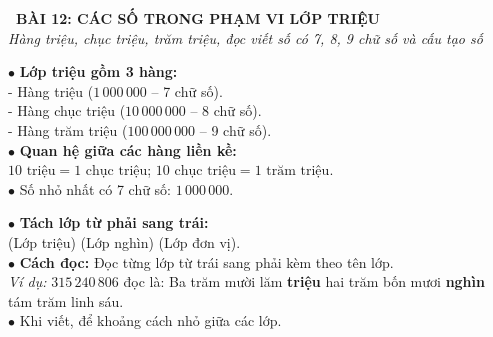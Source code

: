 \documentclass[14pt,a4paper,oneside]{extbook}
\begin{document}
\noindent
\begin{tcolorbox}[
  enhanced,
  colback=teal!8!white,
  colframe=teal!80!black,
  arc=3mm, boxrule=1pt,
  left=3mm, right=3mm, top=2mm, bottom=2mm,
  halign=center
]
  {\Large\bfseries\color{teal!90!black}\faBookmark\ BÀI 12: CÁC SỐ TRONG PHẠM VI LỚP TRIỆU}\\[1.5pt]
  {\footnotesize\itshape\color{black!75} Hàng triệu, chục triệu, trăm triệu, đọc viết số có 7, 8, 9 chữ số và cấu tạo số}
\end{tcolorbox}

\vspace{2.5mm}

\noindent
\begin{minipage}[t]{0.49\textwidth}
  \begin{tcolorbox}[
    enhanced,
    title={\footnotesize\bfseries\color{white}\faGlobe\ 1. Lớp triệu \& Các hàng},
    colback=blue!2!white,
    colframe=blue!75!black,
    arc=2.5mm, boxrule=0.8pt, top=1.8mm, bottom=1.8mm, left=2mm, right=2mm
  ]
    \footnotesize
    $\bullet$ \textbf{Lớp triệu gồm 3 hàng:}\\
    - Hàng triệu ($1\,000\,000$ -- 7 chữ số).\\
    - Hàng chục triệu ($10\,000\,000$ -- 8 chữ số).\\
    - Hàng trăm triệu ($100\,000\,000$ -- 9 chữ số).\\
    $\bullet$ \textbf{Quan hệ giữa các hàng liền kề:}\\
    $10\text{ triệu} = 1\text{ chục triệu}$; $10\text{ chục triệu} = 1\text{ trăm triệu}$.\\
    $\bullet$ Số nhỏ nhất có 7 chữ số: $1\,000\,000$.
  \end{tcolorbox}
\end{minipage}%
\hfill
\begin{minipage}[t]{0.49\textwidth}
  \begin{tcolorbox}[
    enhanced,
    title={\footnotesize\bfseries\color{white}\faPencil\ 2. Kĩ năng đọc viết số lớp triệu},
    colback=teal!2!white,
    colframe=teal!75!black,
    arc=2.5mm, boxrule=0.8pt, top=1.8mm, bottom=1.8mm, left=2mm, right=2mm
  ]
    \footnotesize
    $\bullet$ \textbf{Tách lớp từ phải sang trái:}\\
    (Lớp triệu) (Lớp nghìn) (Lớp đơn vị).\\
    $\bullet$ \textbf{Cách đọc:} Đọc từng lớp từ trái sang phải kèm theo tên lớp.\\
    \textit{Ví dụ:} $315\,240\,806$ đọc là: Ba trăm mười lăm \textbf{triệu} hai trăm bốn mươi \textbf{nghìn} tám trăm linh sáu.\\
    $\bullet$ Khi viết, để khoảng cách nhỏ giữa các lớp.
  \end{tcolorbox}
\end{minipage}
\end{document}
